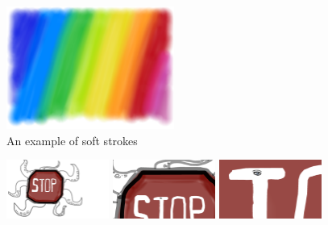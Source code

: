\documentclass[review]{acmsiggraph}
\begin{document}
\begin{figure}
    \centering
        \includegraphics[width=0.49\textwidth]{images/rainbow2}
    \caption{An example of soft strokes}
    \label{fig:rainbow}
\end{figure}

\begin{figure}
    \centering
        \includegraphics[width=0.3\textwidth]{images/stop1}
        \includegraphics[width=0.3\textwidth]{images/stop2}
        \includegraphics[width=0.3\textwidth]{images/stop3}
    \caption{}
    \label{fig:stop}
\end{figure}
\end{document}

